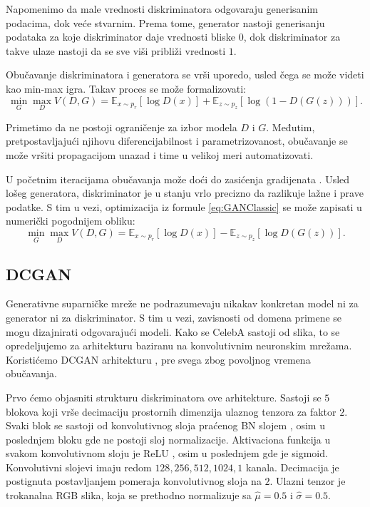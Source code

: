 \documentclass[12pt, a4paper]{article}
\begin{document}
	Napomenimo da male vrednosti diskriminatora odgovaraju generisanim podacima, dok veće stvarnim. Prema tome, generator nastoji generisanju podataka za koje diskriminator daje vrednosti bliske $0$, dok diskriminator za takve ulaze nastoji da se sve viši približi vrednosti $1$.
	
	Obučavanje diskriminatora i generatora se vrši uporedo, usled čega se može videti kao min-max igra. Takav proces se može formalizovati:
	\begin{equation}
	\min_{G}\max_{D}V(D, G) = \mathbb{E}_{x \sim p_r}[\log D(x)] + \mathbb{E}_{z \sim p_z}[\log(1 - D(G(z)))].
	\label{eq:GANClassic}
	\end{equation}
	
	Primetimo da ne postoji ograničenje za izbor modela $D$ i $G$. Međutim, pretpostavljajući njihovu diferencijabilnost i parametrizovanost, obučavanje se može vršiti propagacijom unazad i time u velikoj meri automatizovati.
	
	U početnim iteracijama obučavanja može doći do zasićenja gradijenata \cite{GAN-2014}. Usled lošeg generatora, diskriminator je u stanju vrlo precizno da razlikuje lažne i prave podatke. S tim u vezi, optimizacija iz formule \ref{eq:GANClassic} se može zapisati u numerički pogodnijem obliku:
	\begin{equation}
	\min_{G}\max_{D}V(D, G) = \mathbb{E}_{x \sim p_r}[\log D(x)] - \mathbb{E}_{z \sim p_z}[\log D(G(z))].
	\end{equation}

\subsection{DCGAN}
Generativne suparničke mreže ne podrazumevaju nikakav konkretan model ni za generator ni za diskriminator. S tim u vezi, zavisnosti od domena primene se mogu dizajnirati odgovarajući modeli. Kako se CelebA sastoji od slika, to se opredeljujemo za arhitekturu baziranu na konvolutivnim neuronskim mrežama. Koristićemo DCGAN arhitekturu \cite{DCGAN-2016}, pre svega zbog povoljnog vremena obučavanja.

Prvo ćemo objasniti strukturu diskriminatora ove arhitekture. Sastoji se $5$ blokova koji vrše decimaciju prostornih dimenzija ulaznog tenzora za faktor $2$. Svaki blok se sastoji od konvolutivnog sloja praćenog BN slojem \cite{BN-2015}, osim u poslednjem bloku gde ne postoji sloj normalizacije. Aktivaciona funkcija u svakom konvolutivnom sloju je ReLU \cite{ReLU-2010}, osim u poslednjem gde je sigmoid. Konvolutivni slojevi imaju redom $128, 256, 512, 1024, 1$ kanala. Decimacija je postignuta postavljanjem pomeraja konvolutivnog sloja na $2$. Ulazni tenzor je trokanalna RGB slika, koja se prethodno normalizuje sa $\hat{\mu}=0.5$ i $\hat{\sigma}=0.5$.
\end{document}
